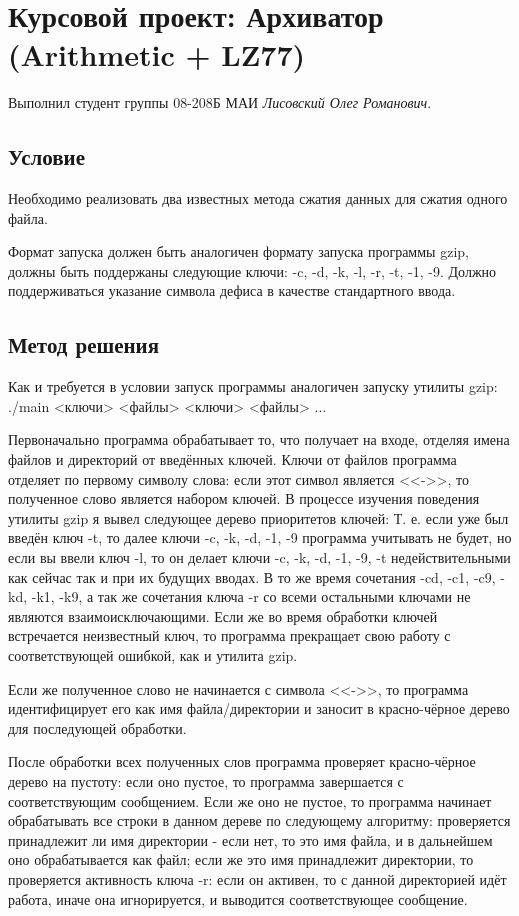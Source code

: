\documentclass[12pt]{article}
\begin{document}
\section*{Курсовой проект: Архиватор (Arithmetic + LZ77)}%
\noindent
Выполнил студент группы 08-208Б МАИ \textit{Лисовский Олег Романович}.%

\subsection*{Условие}

Необходимо реализовать два известных метода сжатия данных для сжатия одного файла. 

Формат запуска должен быть аналогичен формату запуска программы gzip, должны быть поддержаны следующие ключи: -c, -d, -k, -l, -r, -t, -1, -9. Должно поддерживаться указание символа дефиса в качестве стандартного ввода.


\subsection*{Метод решения}

Как и требуется в условии запуск программы аналогичен запуску утилиты gzip: ./main <ключи> <файлы> <ключи> <файлы> ...

Первоначально программа обрабатывает то, что получает на входе, отделяя имена файлов и директорий от введённых ключей. Ключи от файлов программа отделяет по первому символу слова: если этот символ является <<->>, то полученное слово является набором ключей. В процессе изучения поведения утилиты gzip я вывел следующее дерево приоритетов ключей:%
Т. е. если уже был введён ключ -t, то далее ключи -c, -k, -d, -1, -9 программа учитывать не будет, но если вы ввели ключ -l, то он делает ключи -c, -k, -d, -1, -9, -t недействительными как сейчас так и при их будущих вводах. В то же время сочетания -cd, -c1, -c9, -kd, -k1, -k9, а так же сочетания ключа -r со всеми остальными ключами не являются взаимоисключающими. Если же во время обработки ключей встречается неизвестный ключ, то программа прекращает свою работу с соответствующей ошибкой, как и утилита gzip.

Если же полученное слово не начинается с символа <<->>, то программа идентифицирует его как имя файла/директории и заносит в красно-чёрное дерево для последующей обработки.

После обработки всех полученных слов программа проверяет красно-чёрное дерево на пустоту: если оно пустое, то программа завершается с соответствующим сообщением. Если же оно не пустое, то программа начинает обрабатывать все строки в данном дереве по следующему алгоритму: проверяется принадлежит ли имя директории - если нет, то это имя файла, и в дальнейшем оно обрабатывается как файл; если же это имя принадлежит директории, то проверяется активность ключа -r: если он активен, то с данной директорией идёт работа, иначе она игнорируется, и выводится соответствующее сообщение.
\end{document}
